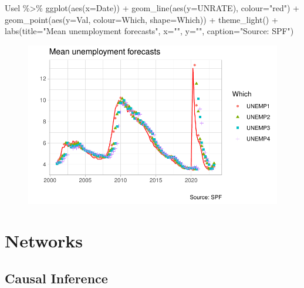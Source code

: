 \documentclass[
  letterpaper,
]{book}
\newenvironment{Shaded}{\begin{snugshade}}{\end{snugshade}}
\newcommand{\AttributeTok}[1]{\textcolor[rgb]{0.40,0.45,0.13}{#1}}
\newcommand{\FunctionTok}[1]{\textcolor[rgb]{0.28,0.35,0.67}{#1}}
\newcommand{\NormalTok}[1]{\textcolor[rgb]{0.00,0.23,0.31}{#1}}
\newcommand{\SpecialCharTok}[1]{\textcolor[rgb]{0.37,0.37,0.37}{#1}}
\newcommand{\StringTok}[1]{\textcolor[rgb]{0.13,0.47,0.30}{#1}}
\begin{document}
\begin{Shaded}
\begin{Highlighting}[]
\NormalTok{Usel }\SpecialCharTok{\%\textgreater{}\%} 
  \FunctionTok{ggplot}\NormalTok{(}\FunctionTok{aes}\NormalTok{(}\AttributeTok{x=}\NormalTok{Date)) }\SpecialCharTok{+} 
  \FunctionTok{geom\_line}\NormalTok{(}\FunctionTok{aes}\NormalTok{(}\AttributeTok{y=}\NormalTok{UNRATE), }\AttributeTok{colour=}\StringTok{"red"}\NormalTok{) }\SpecialCharTok{+} 
  \FunctionTok{geom\_point}\NormalTok{(}\FunctionTok{aes}\NormalTok{(}\AttributeTok{y=}\NormalTok{Val, }\AttributeTok{colour=}\NormalTok{Which, }\AttributeTok{shape=}\NormalTok{Which)) }\SpecialCharTok{+}
  \FunctionTok{theme\_light}\NormalTok{() }\SpecialCharTok{+} 
  \FunctionTok{labs}\NormalTok{(}\AttributeTok{title=}\StringTok{"Mean unemployment forecasts"}\NormalTok{, }\AttributeTok{x=}\StringTok{""}\NormalTok{, }\AttributeTok{y=}\StringTok{""}\NormalTok{, }\AttributeTok{caption=}\StringTok{"Source: SPF"}\NormalTok{)}
\end{Highlighting}
\end{Shaded}

\begin{figure}[H]

{\centering \includegraphics{./QR_files/figure-pdf/unnamed-chunk-2-1.pdf}

}

\end{figure}

\part{Networks}

\hypertarget{causal-inference}{%
\chapter{Causal Inference}\label{causal-inference}}
\end{document}
